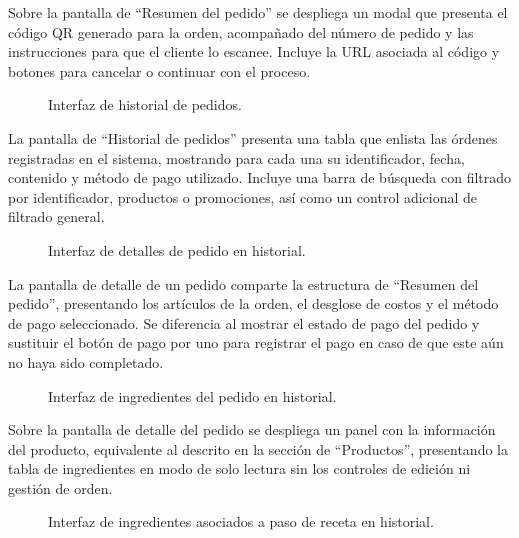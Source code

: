 Sobre la pantalla de ``Resumen del pedido'' se despliega un modal que presenta el código QR generado para la orden, acompañado del número de pedido y las instrucciones para que el cliente lo escanee. Incluye la URL asociada al código y botones para cancelar o continuar con el proceso.

\begin{figure}[H]
    \centering
    
    \caption{Interfaz de historial de pedidos.}
    \label{fig:ui-caj-16}
\end{figure}

La pantalla de ``Historial de pedidos'' presenta una tabla que enlista las órdenes registradas en el sistema, mostrando para cada una su identificador, fecha, contenido y método de pago utilizado. Incluye una barra de búsqueda con filtrado por identificador, productos o promociones, así como un control adicional de filtrado general.

\begin{figure}[H]
    \centering
    
    \caption{Interfaz de detalles de pedido en historial.}
    \label{fig:ui-caj-17}
\end{figure}

La pantalla de detalle de un pedido comparte la estructura de ``Resumen del pedido'', presentando los artículos de la orden, el desglose de costos y el método de pago seleccionado. Se diferencia al mostrar el estado de pago del pedido y sustituir el botón de pago por uno para registrar el pago en caso de que este aún no haya sido completado.

\begin{figure}[H]
    \centering
    
    \caption{Interfaz de ingredientes del pedido en historial.}
    \label{fig:ui-caj-18}
\end{figure}

Sobre la pantalla de detalle del pedido se despliega un panel con la información del producto, equivalente al descrito en la sección de ``Productos'', presentando la tabla de ingredientes en modo de solo lectura sin los controles de edición ni gestión de orden.

\begin{figure}[H]
    \centering
    
    \caption{Interfaz de ingredientes asociados a paso de receta en historial.}
    \label{fig:ui-caj-20-a}
\end{figure}

